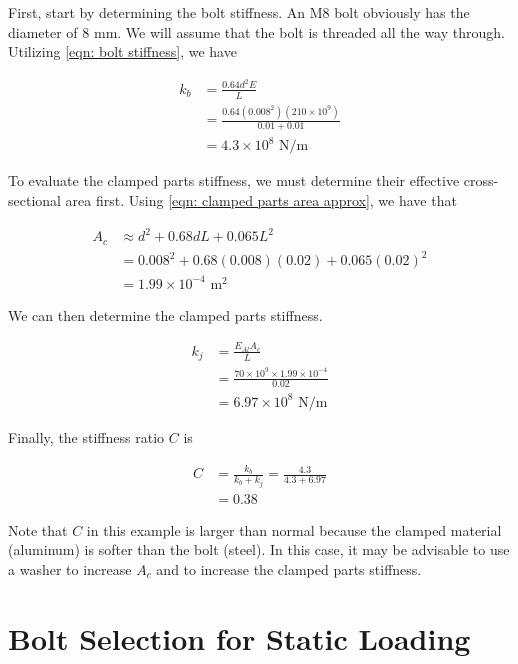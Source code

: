\documentclass[
10pt,
a4paper,
openany,
svgnames,
]{book}
\begin{document}
\begin{solution}
  First, start by determining the bolt stiffness. An M8 bolt obviously has the diameter of 8 mm. We will assume that the bolt is threaded all the way through. Utilizing \cref{eqn: bolt stiffness}, we have

  \begin{align*}
    k_b &= \frac{0.64d^2E}{L} \\
        &= \frac{0.64 (0.008^2)(210 \times 10^9)}{0.01+0.01} \\
        &= 4.3 \times 10^8 \text{ N/m}
  \end{align*}
  
  To evaluate the clamped parts stiffness, we must determine their effective cross-sectional area first. Using \cref{eqn: clamped parts area approx}, we have that

  \begin{align*}
    A_c &\approx d^2 + 0.68dL + 0.065L^2 \\
        &= 0.008^2 + 0.68(0.008)(0.02) + 0.065(0.02)^2 \\
        &= 1.99 \times 10^{-4} \text{ m}^2
  \end{align*}

  We can then determine the clamped parts stiffness.

  \begin{align*}
    k_j &= \frac{E_{Al}A_c}{L} \\
        &= \frac{70 \times 10^9 \times 1.99 \times 10^{-4}}{0.02} \\
        &= 6.97 \times 10^8 \text{ N/m}
  \end{align*}

  Finally, the stiffness ratio $C$ is

  \begin{align*}
    C & = \frac{k_b}{k_b + k_j} = \frac{4.3}{4.3 + 6.97} \\
      &= 0.38
  \end{align*}

  Note that $C$ in this example is larger than normal because the clamped material (aluminum) is softer than the bolt (steel). In this case, it may be advisable to use a washer to increase $A_c$ and to increase the clamped parts stiffness.
\end{solution}


\section{Bolt Selection for Static Loading} \label{sec: bolt for static loading}
\end{document}
